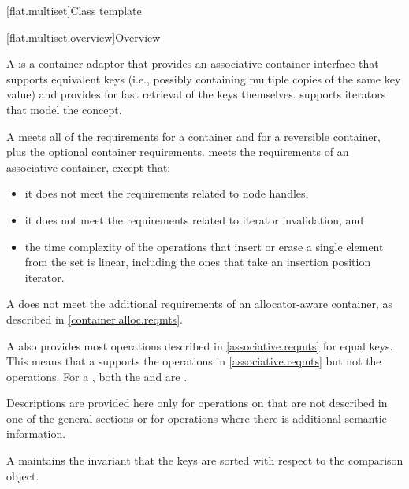 [flat.multiset]{Class template }

[flat.multiset.overview]{Overview}

\pnum
{}%
A  is a container adaptor
that provides an associative container interface
that supports equivalent keys
(i.e., possibly containing multiple copies of the same key value) and
provides for fast retrieval of the keys themselves.
 supports iterators that model the
 concept.

\pnum
A  meets all of the requirements
for a container and
for a reversible container,
plus the optional container requirements.
 meets the requirements of
an associative container, except that:
\begin{itemize}
\item
it does not meet the requirements
related to node handles,
\item
it does not meet the requirements related to iterator invalidation, and
\item
the time complexity of the operations
that insert or erase a single element from the
set is linear,
including the ones that take an insertion position iterator.
\end{itemize}
\begin{note}
A  does not meet
the additional requirements of an allocator-aware container,
as described in \ref{container.alloc.reqmts}.
\end{note}

\pnum
A  also provides most operations
described in \ref{associative.reqmts} for equal keys.
This means that a  supports
the  operations in \ref{associative.reqmts}
but not the  operations.
For a ,
both the  and  are .

\pnum
Descriptions are provided here only for operations on 
that are not described in one of the general sections or
for operations where there is additional semantic information.

\pnum
A  maintains the invariant
that the keys are sorted with respect to the comparison object.

